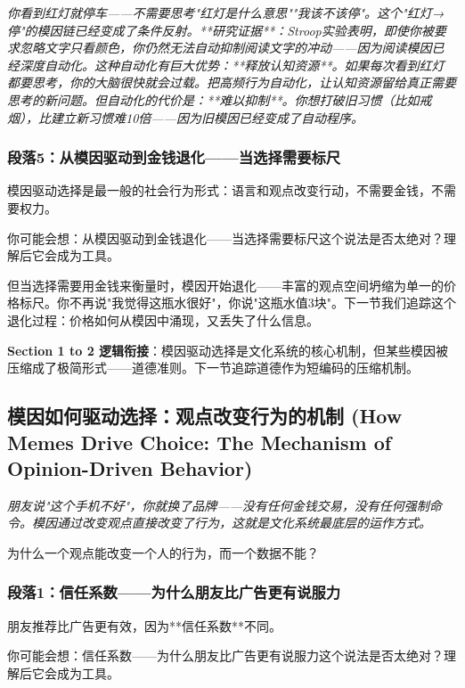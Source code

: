 \documentclass[a4paper,12pt]{book}
\newenvironment{motivation}{\begin{tcolorbox}[colback=gray!10,colframe=gray!60,title=\textit{本章动机},fonttitle=\bfseries,arc=0mm,leftrule=3mm]\small\itshape}{\end{tcolorbox}}
\newenvironment{questionbox}{\begin{tcolorbox}[colback=red!3!white,colframe=red!60!black]}{\end{tcolorbox}}
\begin{document}
\begin{motivation}
\begin{motivation}
\begin{motivation}
你看到红灯就停车——不需要思考"红灯是什么意思""我该不该停"。这个"红灯→停"的模因链已经变成了条件反射。**研究证据**：Stroop实验表明，即使你被要求忽略文字只看颜色，你仍然无法自动抑制阅读文字的冲动——因为阅读模因已经深度自动化。这种自动化有巨大优势：**释放认知资源**。如果每次看到红灯都要思考，你的大脑很快就会过载。把高频行为自动化，让认知资源留给真正需要思考的新问题。但自动化的代价是：**难以抑制**。你想打破旧习惯（比如戒烟），比建立新习惯难10倍——因为旧模因已经变成了自动程序。

	\subsubsection*{段落5：从模因驱动到金钱退化——当选择需要标尺}
	模因驱动选择是最一般的社会行为形式：语言和观点改变行动，不需要金钱，不需要权力。
	\begin{tcolorbox}[colback=yellow!5, title=\textit{读者行为预测}]
		你可能会想：从模因驱动到金钱退化——当选择需要标尺这个说法是否太绝对？理解后它会成为工具。
	\end{tcolorbox}

但当选择需要用金钱来衡量时，模因开始退化——丰富的观点空间坍缩为单一的价格标尺。你不再说"我觉得这瓶水很好"，你说"这瓶水值3块"。下一节我们追踪这个退化过程：价格如何从模因中涌现，又丢失了什么信息。

	\textbf{Section 1 to 2 逻辑衔接}：模因驱动选择是文化系统的核心机制，但某些模因被压缩成了极简形式——道德准则。下一节追踪道德作为短编码的压缩机制。

\subsection{模因如何驱动选择：观点改变行为的机制 (How Memes Drive Choice: The Mechanism of Opinion-Driven Behavior)}
\begin{motivation}
	朋友说"这个手机不好"，你就换了品牌——没有任何金钱交易，没有任何强制命令。模因通过改变观点直接改变了行为，这就是文化系统最底层的运作方式。
\end{motivation}
\begin{questionbox}
	为什么一个观点能改变一个人的行为，而一个数据不能？
\end{questionbox}

	\subsubsection*{段落1：信任系数——为什么朋友比广告更有说服力}
朋友推荐比广告更有效，因为**信任系数**不同。
	\begin{tcolorbox}[colback=yellow!5, title=\textit{读者行为预测}]
		你可能会想：信任系数——为什么朋友比广告更有说服力这个说法是否太绝对？理解后它会成为工具。
	\end{tcolorbox}


\end{motivation}
\end{motivation}
\end{motivation}
\end{document}

